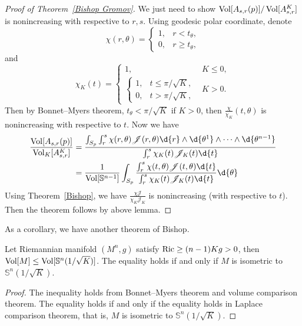 \begin{proof}[Proof of Theorem~\ref{Bishop Gromov}]
    We just need to show $\operatorname{Vol}[A_{s,r}(p)]/\operatorname{Vol}[A_{s,r}^K]$ is nonincreasing with respective to $r,s$.
    Using geodesic polar coordinate, denote
    \[\chi(r,\theta)=\begin{cases}
        1, & r<t_\theta,\\
        0, & r\geq t_\theta,
    \end{cases}\]
    and
    \[\chi_K(t)=\begin{cases}
        1, & K\leq 0,\\
        \begin{cases}
            1, & t\leq\pi/\sqrt{K},\\
            0, & t>\pi/\sqrt{K},
        \end{cases} & K>0.
    \end{cases}\]
    Then by Bonnet--Myers theorem, $t_\theta<\pi/\sqrt{K}$ if $K>0$, then $\frac{\chi}{\chi_K}(t,\theta)$ is nonincreasing with respective to $t$.
    Now we have
    \begin{align*}
        \frac{\Vol[A_{s,r}(p)]}{\Vol_K[A^K_{s,r}]}&=\frac{\int_{S_p}\int_r^s\chi(r,\theta)\mathscr{J}(r,\theta)\d{r}\wedge\d{\theta^1}\wedge\cdots\wedge\d{\theta^{n-1}}}{\int_r^s\chi_K(t)\mathscr{J}_K(t)\d{t}}\\
        &=\frac{1}{\Vol[\mathbb{S}^{n-1}]}\int_{S_p}\frac{\int_r^s\chi(t,\theta)\mathscr{J}(t,\theta)\d{t}}{\int_r^s\chi_K(t)\mathscr{J}_K(t)\d{t}}\d{\theta}
    \end{align*}
    Using Theorem~\ref{Bishop}, we have $\frac{\chi\mathscr{J}}{\chi_K\mathscr{J}_K}$ is nonincreasing (with respective to $t$).
    Then the theorem follows by above lemma.
\end{proof}

As a corollary, we have another theorem of Bishop.
\begin{thm}[Bishop]
    Let Riemannian manifold $(M^n,g)$ satisfy $\operatorname{Ric}\geq(n-1)Kg>0$, then $\operatorname{Vol}[M]\leq\operatorname{Vol}[\mathbb{S}^n(1/\sqrt{K})]$.
    The equality holds if and only if $M$ is isometric to $\mathbb{S}^n(1/\sqrt{K})$.
\end{thm}
\begin{proof}
    The inequality holds from Bonnet--Myers theorem and volume comparison theorem.
    The equality holds if and only if the equality holds in Laplace comparison theorem, that is, $M$ is isometric to $\mathbb{S}^n(1/\sqrt{K})$.
\end{proof}

